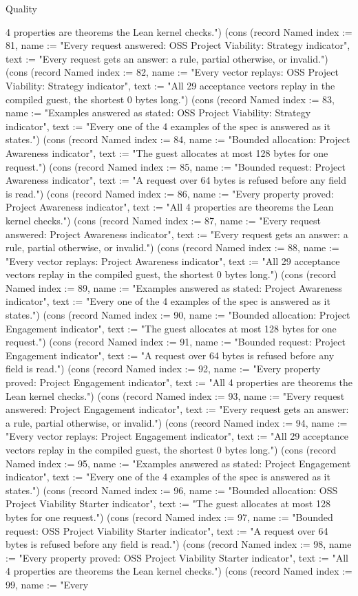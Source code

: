 \begin{lexlean}{Quality}
\begin{semanticmodule}
{4 properties are theorems the Lean kernel checks."}) (cons (record Named {index := 81, name := "Every request answered: OSS Project Viability: Strategy indicator", text := "Every request gets an answer: a rule, partial otherwise, or invalid."}) (cons (record Named {index := 82, name := "Every vector replays: OSS Project Viability: Strategy indicator", text := "All 29 acceptance vectors replay in the compiled guest, the shortest 0 bytes long."}) (cons (record Named {index := 83, name := "Examples answered as stated: OSS Project Viability: Strategy indicator", text := "Every one of the 4 examples of the spec is answered as it states."}) (cons (record Named {index := 84, name := "Bounded allocation: Project Awareness indicator", text := "The guest allocates at most 128 bytes for one request."}) (cons (record Named {index := 85, name := "Bounded request: Project Awareness indicator", text := "A request over 64 bytes is refused before any field is read."}) (cons (record Named {index := 86, name := "Every property proved: Project Awareness indicator", text := "All 4 properties are theorems the Lean kernel checks."}) (cons (record Named {index := 87, name := "Every request answered: Project Awareness indicator", text := "Every request gets an answer: a rule, partial otherwise, or invalid."}) (cons (record Named {index := 88, name := "Every vector replays: Project Awareness indicator", text := "All 29 acceptance vectors replay in the compiled guest, the shortest 0 bytes long."}) (cons (record Named {index := 89, name := "Examples answered as stated: Project Awareness indicator", text := "Every one of the 4 examples of the spec is answered as it states."}) (cons (record Named {index := 90, name := "Bounded allocation: Project Engagement indicator", text := "The guest allocates at most 128 bytes for one request."}) (cons (record Named {index := 91, name := "Bounded request: Project Engagement indicator", text := "A request over 64 bytes is refused before any field is read."}) (cons (record Named {index := 92, name := "Every property proved: Project Engagement indicator", text := "All 4 properties are theorems the Lean kernel checks."}) (cons (record Named {index := 93, name := "Every request answered: Project Engagement indicator", text := "Every request gets an answer: a rule, partial otherwise, or invalid."}) (cons (record Named {index := 94, name := "Every vector replays: Project Engagement indicator", text := "All 29 acceptance vectors replay in the compiled guest, the shortest 0 bytes long."}) (cons (record Named {index := 95, name := "Examples answered as stated: Project Engagement indicator", text := "Every one of the 4 examples of the spec is answered as it states."}) (cons (record Named {index := 96, name := "Bounded allocation: OSS Project Viability Starter indicator", text := "The guest allocates at most 128 bytes for one request."}) (cons (record Named {index := 97, name := "Bounded request: OSS Project Viability Starter indicator", text := "A request over 64 bytes is refused before any field is read."}) (cons (record Named {index := 98, name := "Every property proved: OSS Project Viability Starter indicator", text := "All 4 properties are theorems the Lean kernel checks."}) (cons (record Named {index := 99, name := "Every }
\end{semanticmodule}
\end{lexlean}
